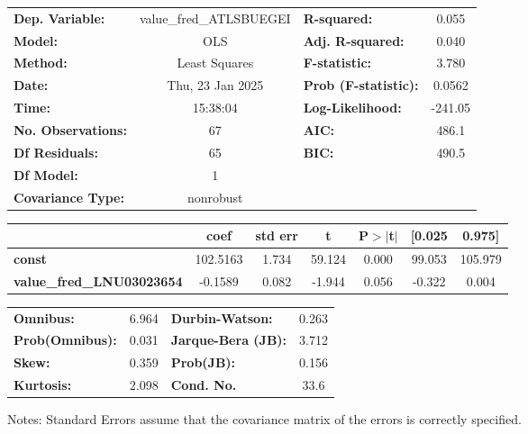 \begin{center}
\begin{tabular}{lclc}
\toprule
\textbf{Dep. Variable:}           & value\_fred\_ATLSBUEGEI & \textbf{  R-squared:         } &     0.055   \\
\textbf{Model:}                   &           OLS           & \textbf{  Adj. R-squared:    } &     0.040   \\
\textbf{Method:}                  &      Least Squares      & \textbf{  F-statistic:       } &     3.780   \\
\textbf{Date:}                    &     Thu, 23 Jan 2025    & \textbf{  Prob (F-statistic):} &   0.0562    \\
\textbf{Time:}                    &         15:38:04        & \textbf{  Log-Likelihood:    } &   -241.05   \\
\textbf{No. Observations:}        &              67         & \textbf{  AIC:               } &     486.1   \\
\textbf{Df Residuals:}            &              65         & \textbf{  BIC:               } &     490.5   \\
\textbf{Df Model:}                &               1         & \textbf{                     } &             \\
\textbf{Covariance Type:}         &        nonrobust        & \textbf{                     } &             \\
\bottomrule
\end{tabular}
\begin{tabular}{lcccccc}
                                  & \textbf{coef} & \textbf{std err} & \textbf{t} & \textbf{P$> |$t$|$} & \textbf{[0.025} & \textbf{0.975]}  \\
\midrule
\textbf{const}                    &     102.5163  &        1.734     &    59.124  &         0.000        &       99.053    &      105.979     \\
\textbf{value\_fred\_LNU03023654} &      -0.1589  &        0.082     &    -1.944  &         0.056        &       -0.322    &        0.004     \\
\bottomrule
\end{tabular}
\begin{tabular}{lclc}
\textbf{Omnibus:}       &  6.964 & \textbf{  Durbin-Watson:     } &    0.263  \\
\textbf{Prob(Omnibus):} &  0.031 & \textbf{  Jarque-Bera (JB):  } &    3.712  \\
\textbf{Skew:}          &  0.359 & \textbf{  Prob(JB):          } &    0.156  \\
\textbf{Kurtosis:}      &  2.098 & \textbf{  Cond. No.          } &     33.6  \\
\bottomrule
\end{tabular}
\end{center}

Notes: \newline
 [1] Standard Errors assume that the covariance matrix of the errors is correctly specified.